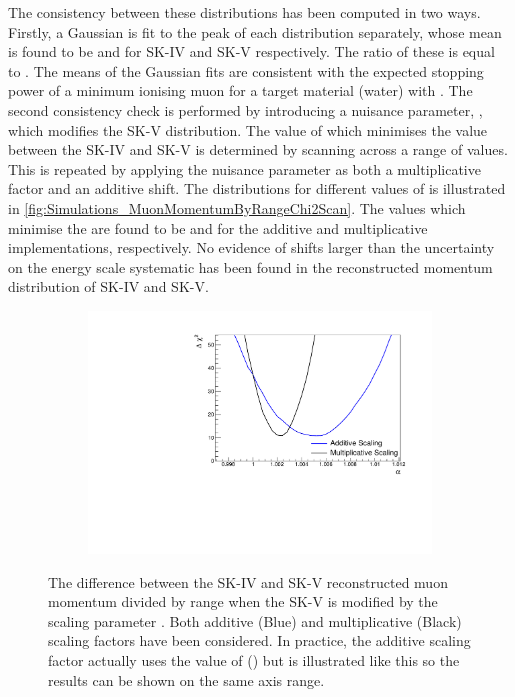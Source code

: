 The consistency between these distributions has been computed in two ways. Firstly, a Gaussian is fit to the peak of each distribution separately, whose mean is found to be  and  for SK-IV and SK-V respectively. The ratio of these is equal to . The means of the Gaussian fits are consistent with the expected stopping power of a minimum ionising muon for a target material (water) with  \cite{PhysRevD.86.010001}. The second consistency check is performed by introducing a nuisance parameter, \quickmath{\alpha}, which modifies the SK-V distribution. The value of \quickmath{\alpha} which minimises the  value between the SK-IV and SK-V is determined by scanning across a range of values. This is repeated by applying the nuisance parameter as both a multiplicative factor and an additive shift. The  distributions for different values of \quickmath{\alpha} is illustrated in \autoref{fig:Simulations_MuonMomentumByRangeChi2Scan}. The values which minimise the  are found to be  and  for the additive and multiplicative implementations, respectively. No evidence of shifts larger than the  uncertainty on the energy scale systematic has been found in the reconstructed momentum distribution of SK-IV and SK-V.

\begin{figure}[h]
  \begin{subfigure}[t]{\textwidth}
    \includegraphics[width=\textwidth, trim={0mm 0mm 0mm 0mm}, clip, page=1]{Figures/Simulations/MuonRange_Chi2Scan.pdf}
  \end{subfigure}
  \caption{The  difference between the SK-IV and SK-V reconstructed muon momentum divided by range when the SK-V is modified by the scaling parameter \quickmath{\alpha}. Both additive (Blue) and multiplicative (Black) scaling factors have been considered. In practice, the additive scaling factor actually uses the value of () but is illustrated like this so the results can be shown on the same axis range.}
  \label{fig:Simulations_MuonMomentumByRangeChi2Scan}
\end{figure}

